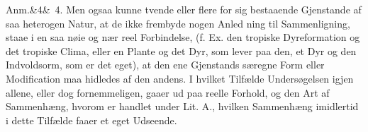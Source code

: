 \documentclass[12pt]{book}
\def\sperr#1{#1}%
\def\textit#1{#1}%
\newcommand{\sperr}[1]{\textls[180]{#1}}
\newcommand{\anm}[1]{%
  \par\vspace{0.5\baselineskip}%
  \noindent\hspace{\parindent}\sperr{Anm.}\ifx&#1&\else~\textit{#1}.\fi
  \enspace\ignorespaces
}
\newcommand{\opage}[1]{\marginnote{\footnotesize\textit{[#1]}}}
\begin{document}
\anm{4} Men ogsaa kunne tvende eller flere for sig bestaaende Gjenstande af saa
heterogen Natur, at de ikke frembyde nogen Anled%
\opage{207}ning til Sammenligning, staae i en saa nøie og nær reel Forbindelse, (f. Ex. den
tropiske Dyreformation og det tropiske Clima, eller en Plante og det Dyr, som
lever paa den, et Dyr og den Indvoldsorm, som er det eget), at den ene
Gjenstands særegne Form eller Modification maa hidledes af den andens. I hvilket
Tilfælde Undersøgelsen igjen allene, eller dog fornemmeligen, gaaer ud paa reelle
Forhold, og den Art af Sammenhæng, hvorom er handlet under Lit. \textit{A}.,
hvilken Sammenhæng imidlertid i dette Tilfælde faaer et eget Udseende.
\end{document}
